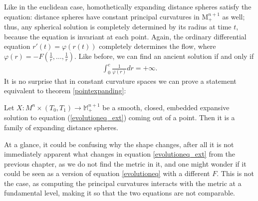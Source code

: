 Like in the euclidean case, homothetically expanding distance spheres satisfy the equation: distance spheres have constant principal curvatures in $\mathrm{M}^{n+1}_+$ as well; thus, any spherical solution is completely determined by its radius at time $t$, because the equation is invariant at each point. Again, the ordinary differential equation $r'(t) = \varphi(r(t))$ completely determines the flow, where $\varphi(r) = -F(\frac{1}{r}, \dots, \frac{1}{r})$. Like before, we can find an ancient solution if and only if
\begin{align*}
	\int_{0}^{c}\frac{1}{\varphi(r)} dr =+\infty.
\end{align*}
It is no surprise that in constant curvature spaces we can prove a statement equivalent to theorem \ref{pointexpanding}:

\begin{theorem}
	Let $ X : M^n \times (T_0, T_1) \to \mathbb{M}^{n+1}_+ $ be a smooth, closed, embedded expansive solution to equation (\ref{evolutioneq_ext}) coming out of a point. Then it is a family of expanding distance spheres. \label{expandingflowext}
\end{theorem}
\begin{oss}
	At a glance, it could be confusing why the shape changes, after all it is not immediately apparent what changes in equation  	\ref{evolutioneq_ext} from the previous chapter, as we do not find the metric in it, and one might wonder if it could be seen as a version of equation  \ref{evolutioneq} with a different $F$. This is not the case, as computing the principal curvatures interacts with the metric at a fundamental level, making it so that the two equations are not comparable.
\end{oss}

